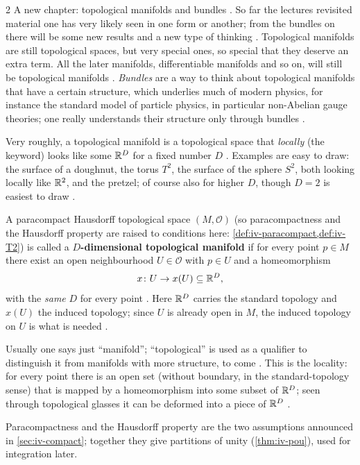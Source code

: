 \begin{paracol}{2}
A new chapter: topological manifolds and bundles . So far the lectures revisited material one has very likely seen in one form or another; from the bundles on there will be some new
results and a new type of thinking . Topological manifolds are still topological spaces, but very special ones, so special that they deserve an extra term. All the later manifolds,
differentiable manifolds and so on, will still be topological manifolds . \emph{Bundles} are a way to think about topological manifolds that have a certain structure,
which underlies much of modern physics, for instance the standard model of particle physics, in particular non-Abelian gauge theories; one really understands their structure only through bundles
.

Very roughly, a topological manifold is a topological space that \emph{locally} (the keyword) looks like some $\mathbb{R}^D$ for a fixed number $D$ . Examples are easy to draw: the surface of a
doughnut, the torus $T^2$, the surface of the sphere $S^2$, both looking locally like $\mathbb{R}^2$, and the pretzel; of course also for higher $D$, though $D=2$ is easiest to draw .

\begin{definition}\label{def:mf-manifold}
A paracompact Hausdorff topological space $(M,\mathcal O)$ (so paracompactness and the Hausdorff property are raised to conditions here: \cref{def:iv-paracompact,def:iv-T2}) is called a \textbf{$D$-dimensional
topological manifold} if for every point $p\in M$ there exist an open neighbourhood $U\in\mathcal O$ with $p\in U$ and a homeomorphism
\[
  x\colon U\to x(U)\subseteq\mathbb{R}^D,
\]
with the \emph{same} $D$ for every point .
Here $\mathbb{R}^D$ carries the standard topology and $x(U)$ the induced topology; since $U$ is already open in $M$, the induced topology on $U$ is what is needed .
\end{definition}
Usually one says just ``manifold''; ``topological'' is used as a qualifier to distinguish it from manifolds with more structure, to come . This is the locality: for every point there is an open set
(without boundary, in the standard-topology sense) that is mapped by a homeomorphism into some subset of $\mathbb{R}^D$; seen through topological glasses it can be deformed into a piece of $\mathbb{R}^D$ .
\begin{recall}
Paracompactness and the Hausdorff property are the two assumptions announced in \cref{sec:iv-compact}; together they give partitions of unity (\cref{thm:iv-pou}), used for integration later.
\end{recall}


\end{paracol}
